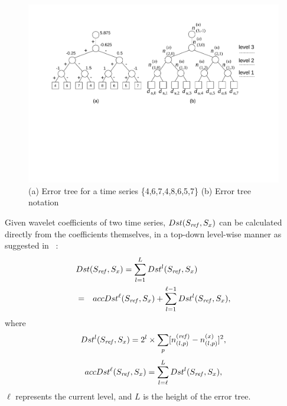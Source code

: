 \begin{figure}[t!]
\includegraphics[width=\linewidth]{error-tree.pdf}
\vspace{-0.2in}
\caption{(a) Error tree for a time series \{4,6,7,4,8,6,5,7\}
(b) Error tree notation}
\label{fig:error-tree}
\end{figure}

Given wavelet coefficients of two time series, $Dst(\Sref,S_x)$
can be calculated directly from the coefficients themselves, in a top-down
level-wise manner as suggested in \LeeWave{}~\cite{Yeh:2008:LLD}: 
{\small
\begin{eqnarray}
\lefteqn{Dst(\Sref,S_{x}) = \sum_{l=1}^{L}Dst^{l}(\Sref,S_{x})} \notag \\
& = & accDst^{\ell }(\Sref,S_{x})+\sum_{l=1}^{\ell-1}Dst^{l}(\Sref,S_{x}),
 \label{eq:truedistance} 
\end{eqnarray}
\noindent
where
\begin{equation*}
Dst^{l}(\Sref,S_x)= 2^{l} \times \sum_{p}[n_{(l,p)}^{(\supref)}-n_{(l,p)}^{(x)}]^{2},
\end{equation*}\vspace{-0.1in}
\begin{equation*}
accDst^{\ell}(\Sref,S_x)=\sum_{l =\ell}^{L}Dst^{l }(\Sref,S_x),
\end{equation*}}
\noindent\hspace{-0.1in}
$\ell$ represents the current level, and $L$ is the height of the error tree.

